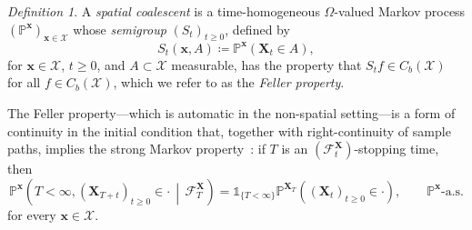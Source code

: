 \documentclass[reqno,draft]{amsart}
\numberwithin{equation}{section}
\theoremstyle{plain}
\theoremstyle{remark}
\newtheorem{definition}[theorem]{Definition}
\newcommand{\R}{\mathbb{R}} %
\renewcommand{\P}{\mathbb{P}} %
\newcommand{\ind}{\mathds{1}}
\newcommand{\semi}{S}
\begin{document}
\begin{definition}\label{def:coal}
    A \emph{spatial coalescent} is a time-homogeneous $\Omega$-valued Markov process $(\P^{\boldsymbol x})_{\boldsymbol x\in \mathcal{X}}$ whose \emph{semigroup} $(\semi_t)_{t\ge 0}$, defined by
    \begin{equation}\label{eq:semi}
        \semi_t(\boldsymbol x,A) \coloneqq \P^{\boldsymbol x}(\boldsymbol X_t \in A),
    \end{equation}
    for $\boldsymbol x\in \mathcal{X}$, $t\ge 0$, and $A\subset \mathcal{X}$ measurable,
    has the property that $\semi_t f \in C_b(\mathcal{X})$ for all $f \in C_b(\mathcal{X})$, which we refer to as the \emph{Feller property}.
\end{definition}
The Feller property---which is automatic in the non-spatial setting---is a form of continuity in the initial condition that, together with right-continuity of sample paths, implies the strong Markov property~\cite[Thm.\ 8.3]{rogers}:
if $T$ is an $(\mathcal{F}^{\boldsymbol X}_t)$-stopping time, then \[
    \P^{\boldsymbol x} \left(T < \infty, (\boldsymbol X_{T+t})_{t\ge 0} \in \cdot  \,\middle\vert\, \mathcal{F}^{\boldsymbol X}_T\right) = \ind_{\{T < \infty\}}\P^{\boldsymbol X_T}((\boldsymbol X_t)_{t\ge 0} \in \cdot ),\qquad \text{$\P^{\boldsymbol x}$-a.s.}
\] for every $\boldsymbol x\in \mathcal{X}$.
\end{document}
